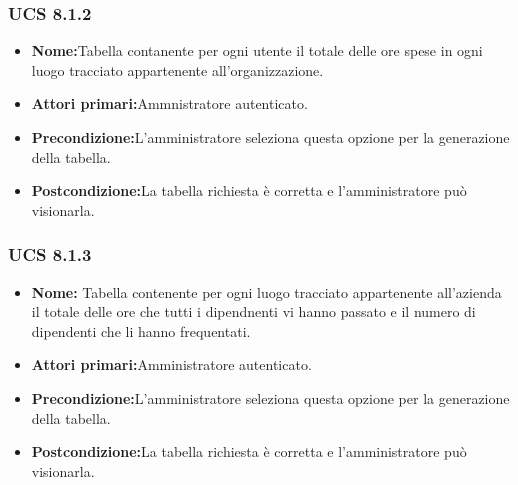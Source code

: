 \subsubsection{UCS 8.1.2}%
\begin{itemize}
\item \textbf{Nome:}Tabella contanente per ogni utente il totale delle ore spese in ogni luogo tracciato appartenente all'organizzazione.
\item \textbf{Attori primari:}Ammnistratore autenticato.
\item \textbf{Precondizione:}L'amministratore seleziona questa opzione per la generazione della tabella.
\item \textbf{Postcondizione:}La tabella richiesta è corretta e l'amministratore può visionarla.
\end{itemize}

\subsubsection{UCS 8.1.3}%
\begin{itemize}
\item \textbf{Nome:} Tabella contenente per ogni luogo tracciato appartenente all'azienda il totale delle ore che tutti i dipendnenti vi hanno passato e il numero di dipendenti che li hanno frequentati.
\item \textbf{Attori primari:}Amministratore autenticato.
\item \textbf{Precondizione:}L'amministratore seleziona questa opzione per la generazione della tabella.
\item \textbf{Postcondizione:}La tabella richiesta è corretta e l'amministratore può visionarla.
\end{itemize}

